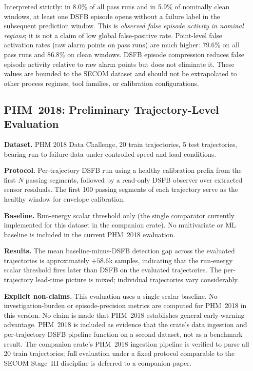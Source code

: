 \documentclass[11pt,letterpaper]{article}
\theoremstyle{scresult}
\begin{document}
\noindent Interpreted strictly: in 8.0\% of all pass runs and in 5.9\% of
nominally clean windows, at least one DSFB episode opens without a failure
label in the subsequent prediction window. This is \emph{observed false episode
activity in nominal regions}; it is not a claim of low global false-positive rate.
Point-level false activation rates (raw alarm points on pass runs) are much
higher: 79.6\% on all pass runs and 86.8\% on clean windows. DSFB episode
compression reduces false episode activity relative to raw alarm points but
does not eliminate it. These values are bounded to the SECOM dataset and
should not be extrapolated to other process regimes, tool families, or
calibration configurations.

\subsection{PHM~2018: Preliminary Trajectory-Level Evaluation}
\label{sec:phm2018}

\textbf{Dataset.} PHM 2018 Data Challenge, 20 train trajectories, 5 test
trajectories, bearing run-to-failure data under controlled speed and load
conditions.

\textbf{Protocol.} Per-trajectory DSFB run using a healthy calibration prefix
from the first $N$ passing segments, followed by a read-only DSFB observer over
extracted sensor residuals. The first 100 passing segments of each trajectory
serve as the healthy window for envelope calibration.

\textbf{Baseline.} Run-energy scalar threshold only (the single comparator
currently implemented for this dataset in the companion crate). No
multivariate or ML baseline is included in the current PHM~2018 evaluation.

\textbf{Results.} The mean baseline-minus-DSFB detection gap across the
evaluated trajectories is approximately $+58.6$k samples, indicating that the
run-energy scalar threshold fires later than DSFB on the evaluated trajectories.
The per-trajectory lead-time picture is mixed; individual trajectories vary
considerably.

\textbf{Explicit non-claims.} This evaluation uses a single scalar baseline.
No investigation-burden or episode-precision metrics are computed for
PHM~2018 in this version. No claim is made that PHM~2018 establishes general
early-warning advantage. PHM~2018 is included as evidence that the crate's data
ingestion and per-trajectory DSFB pipeline function on a second dataset, not
as a benchmark result. The companion crate's PHM~2018 ingestion pipeline is
verified to parse all 20 train trajectories; full evaluation under a fixed
protocol comparable to the SECOM Stage~III discipline is deferred to a
companion paper.
\end{document}
